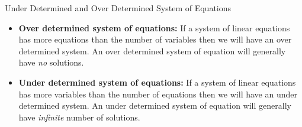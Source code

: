 \begin{defbox}{Under Determined and Over Determined System of Equations}
	\begin{itemize}
		\item \textbf{Over determined system of equations:} If a system of linear equations has more equations than the number of variables then we will have an over determined system. An over determined system of equation will generally have \emph{no} solutions.
		
		\item \textbf{Under determined system of equations:} If a system of linear equations has more variables than the number of equations then we will have an under determined system. An under determined system of equation will generally have \emph{infinite} number of solutions.
	\end{itemize}

\end{defbox}







